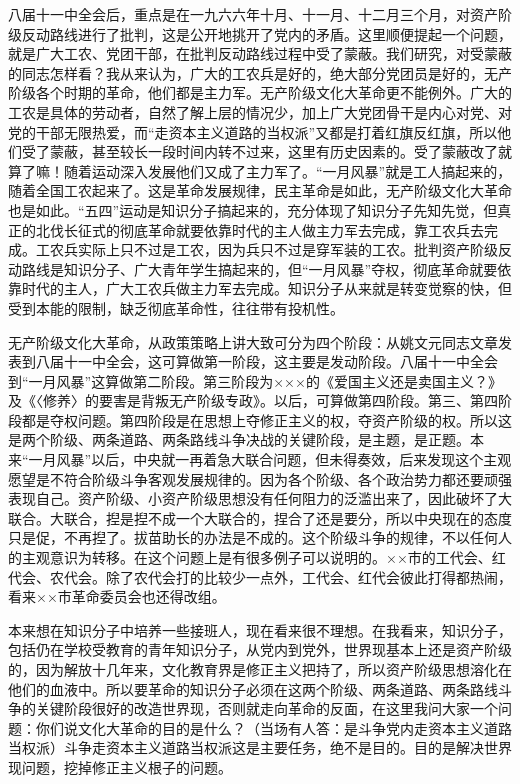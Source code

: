 八届十一中全会后，重点是在一九六六年十月、十一月、十二月三个月，对资产阶级反动路线进行了批判，这是公开地挑开了党内的矛盾。这里顺便提起一个问题，就是广大工农、党团干部，在批判反动路线过程中受了蒙蔽。我们研究，对受蒙蔽的同志怎样看？我从来认为，广大的工农兵是好的，绝大部分党团员是好的，无产阶级各个时期的革命，他们都是主力军。无产阶级文化大革命更不能例外。广大的工农是具体的劳动者，自然了解上层的情况少，加上广大党团骨干是内心对党、对党的干部无限热爱，而“走资本主义道路的当权派”又都是打着红旗反红旗，所以他们受了蒙蔽，甚至较长一段时间内转不过来，这里有历史因素的。受了蒙蔽改了就算了嘛！随着运动深入发展他们又成了主力军了。“一月风暴”就是工人搞起来的，随着全国工农起来了。这是革命发展规律，民主革命是如此，无产阶级文化大革命也是如此。“五四”运动是知识分子搞起来的，充分体现了知识分子先知先觉，但真正的北伐长征式的彻底革命就要依靠时代的主人做主力军去完成，靠工农兵去完成。工农兵实际上只不过是工农，因为兵只不过是穿军装的工农。批判资产阶级反动路线是知识分子、广大青年学生搞起来的，但“一月风暴”夺权，彻底革命就要依靠时代的主人，广大工农兵做主力军去完成。知识分子从来就是转变觉察的快，但受到本能的限制，缺乏彻底革命性，往往带有投机性。

无产阶级文化大革命，从政策策略上讲大致可分为四个阶段：从姚文元同志文章发表到八届十一中全会，这可算做第一阶段，这主要是发动阶段。八届十一中全会到“一月风暴”这算做第二阶段。第三阶段为×××的《爱国主义还是卖国主义？》及《〈修养〉的要害是背叛无产阶级专政》。以后，可算做第四阶段。第三、第四阶段都是夺权问题。第四阶段是在思想上夺修正主义的权，夺资产阶级的权。所以这是两个阶级、两条道路、两条路线斗争决战的关键阶段，是主题，是正题。本来“一月风暴”以后，中央就一再着急大联合问题，但未得奏效，后来发现这个主观愿望是不符合阶级斗争客观发展规律的。因为各个阶级、各个政治势力都还要顽强表现自己。资产阶级、小资产阶级思想没有任何阻力的泛滥出来了，因此破坏了大联合。大联合，揑是揑不成一个大联合的，捏合了还是要分，所以中央现在的态度只是促，不再揑了。拔苗助长的办法是不成的。这个阶级斗争的规律，不以任何人的主观意识为转移。在这个问题上是有很多例子可以说明的。××市的工代会、红代会、农代会。除了农代会打的比较少一点外，工代会、红代会彼此打得都热闹，看来××市革命委员会也还得改组。

本来想在知识分子中培养一些接班人，现在看来很不理想。在我看来，知识分子，包括仍在学校受教育的青年知识分子，从党内到党外，世界现基本上还是资产阶级的，因为解放十几年来，文化教育界是修正主义把持了，所以资产阶级思想溶化在他们的血液中。所以要革命的知识分子必须在这两个阶级、两条道路、两条路线斗争的关键阶段很好的改造世界现，否则就走向革命的反面，在这里我问大家一个问题：你们说文化大革命的目的是什么？（当场有人答：是斗争党内走资本主义道路当权派）斗争走资本主义道路当权派这是主要任务，绝不是目的。目的是解决世界现问题，挖掉修正主义根子的问题。

